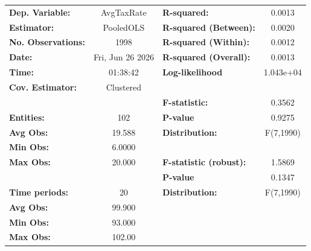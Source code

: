 \begin{center}
\begin{tabular}{lclc}
\toprule
\textbf{Dep. Variable:}                       &     AvgTaxRate     & \textbf{  R-squared:         }   &      0.0013      \\
\textbf{Estimator:}                           &     PooledOLS      & \textbf{  R-squared (Between):}  &      0.0020      \\
\textbf{No. Observations:}                    &        1998        & \textbf{  R-squared (Within):}   &      0.0012      \\
\textbf{Date:}                                &  Fri, Jun 26 2026  & \textbf{  R-squared (Overall):}  &      0.0013      \\
\textbf{Time:}                                &      01:38:42      & \textbf{  Log-likelihood     }   &    1.043e+04     \\
\textbf{Cov. Estimator:}                      &     Clustered      & \textbf{                     }   &                  \\
\textbf{}                                     &                    & \textbf{  F-statistic:       }   &      0.3562      \\
\textbf{Entities:}                            &        102         & \textbf{  P-value            }   &      0.9275      \\
\textbf{Avg Obs:}                             &       19.588       & \textbf{  Distribution:      }   &    F(7,1990)     \\
\textbf{Min Obs:}                             &       6.0000       & \textbf{                     }   &                  \\
\textbf{Max Obs:}                             &       20.000       & \textbf{  F-statistic (robust):} &      1.5869      \\
\textbf{}                                     &                    & \textbf{  P-value            }   &      0.1347      \\
\textbf{Time periods:}                        &         20         & \textbf{  Distribution:      }   &    F(7,1990)     \\
\textbf{Avg Obs:}                             &       99.900       & \textbf{                     }   &                  \\
\textbf{Min Obs:}                             &       93.000       & \textbf{                     }   &                  \\
\textbf{Max Obs:}                             &       102.00       & \textbf{                     }   &                  \\

\end{tabular}
\end{center}
